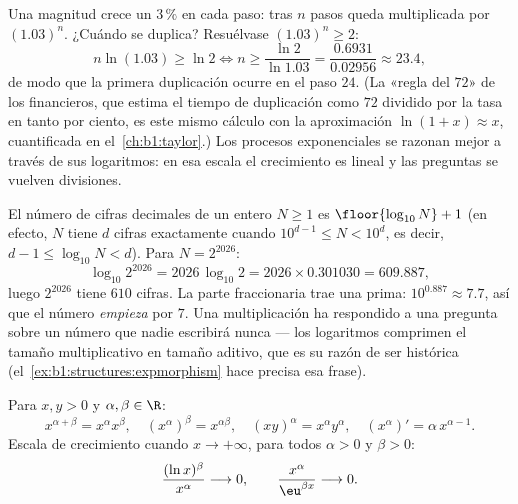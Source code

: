 \begin{example}\label{ex:b1:functions:doubling}
Una magnitud crece un $3\,\%$ en cada paso: tras $n$ pasos queda
multiplicada por $(1.03)^n$. ¿Cuándo se duplica? Resuélvase
$(1.03)^n \geq 2$:
\[
n\ln(1.03) \geq \ln2
\iff n \geq \frac{\ln 2}{\ln 1.03}
= \frac{0.6931}{0.02956} \approx 23.4 ,
\]
de modo que la primera duplicación ocurre en el paso $24$. (La «regla
del $72$» de los financieros, que estima el tiempo de duplicación como
$72$ dividido por la tasa en tanto por ciento, es este mismo cálculo
con la aproximación $\ln(1 + x) \approx x$, cuantificada en
el~\cref{ch:b1:taylor}.) Los procesos exponenciales se razonan mejor a
través de sus logaritmos: en esa escala el crecimiento es lineal y las
preguntas se vuelven divisiones.
\end{example}

\begin{example}\label{ex:b1:functions:digits}
El número de cifras decimales de un entero $N \geq 1$ es
$\floor{\log_{10} N} + 1$ (en efecto, $N$ tiene $d$ cifras exactamente
cuando $10^{d-1} \leq N < 10^d$, es decir, $d - 1 \leq \log_{10}N < d$).
Para $N = 2^{2026}$:
\[
\log_{10} 2^{2026} = 2026\,\log_{10}2
= 2026 \times 0.301030 = 609.887 ,
\]
luego $2^{2026}$ tiene $610$ cifras. La parte fraccionaria trae una
prima: $10^{0.887} \approx 7.7$, así que el número \emph{empieza} por
$7$. Una multiplicación ha respondido a una pregunta sobre un número
que nadie escribirá nunca --- los logaritmos comprimen el tamaño
multiplicativo en tamaño aditivo, que es su razón de ser histórica
(el~\cref{ex:b1:structures:expmorphism} hace precisa esa frase).
\end{example}

\begin{proposition}\label{prop:b1:functions:powerrules}
Para $x, y > 0$ y $\alpha, \beta \in \R$:
\[
x^{\alpha+\beta} = x^\alpha x^\beta, \quad
(x^\alpha)^\beta = x^{\alpha\beta}, \quad
(xy)^\alpha = x^\alpha y^\alpha, \quad
(x^\alpha)' = \alpha\, x^{\alpha - 1}.
\]
Escala de crecimiento cuando
$x \to +\infty$, para todos $\alpha > 0$ y $\beta > 0$:
\[
\frac{(\ln x)^\beta}{x^\alpha} \longrightarrow 0,
\qquad
\frac{x^\alpha}{\eu^{\beta x}} \longrightarrow 0 .
\]
\end{proposition}

